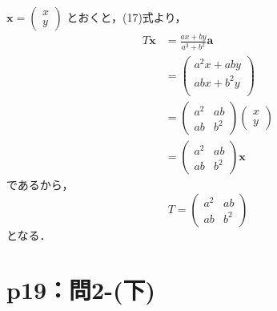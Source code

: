 \documentclass[a4paper,10pt,fleqn]{ltjsarticle}
\begin{document}
\begin{tleftbar}
  $\bm{x} =
    \begin{pmatrix}
      x \\
      y
    \end{pmatrix}
  $
  とおくと，(17)式より，
  \begin{align*}
    T \bm{x} & = \frac{ax+by}{a^2+b^2} \bm{a} \\
             & =
    \begin{pmatrix}
      a^2x +aby   \\
      ab x + b^2y \\
    \end{pmatrix}
    \\
             & =
    \begin{pmatrix}
      a^2 & ab  \\
      ab  & b^2
    \end{pmatrix}
    \begin{pmatrix}
      x \\
      y
    \end{pmatrix}
    \\
             & =
    \begin{pmatrix}
      a^2 & ab  \\
      ab  & b^2
    \end{pmatrix}
    \bm{x}
  \end{align*}
  であるから，
  \[
    T=\begin{pmatrix}
      a^2 & ab  \\
      ab  & b^2
    \end{pmatrix}
  \]
  となる．
\end{tleftbar}
%
\newpage

\section*{p19：問2-(下)}
\end{document}
